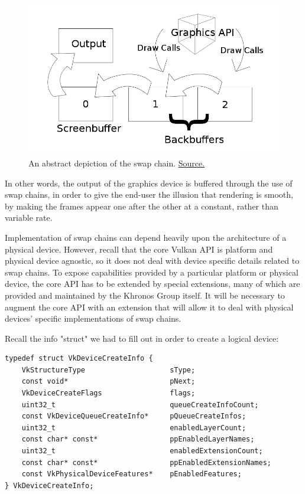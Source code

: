 \documentclass[12pt,letterpaper]{article}
\begin{document}
		\begin{figure}
			\centering
			\includegraphics[width=0.7\linewidth]{swap-chain-depiction}
			\caption{An abstract depiction of the swap chain. \href{https://en.wikipedia.org/wiki/File:Swap_chain_depiction.svg}{Source.}}
			\label{fig:swap-chain-depiction}
		\end{figure}

	In other words, the output of the graphics device is buffered through the use of swap chains, in order to give the end-user the illusion that rendering is smooth, by making the frames appear one after the other at a constant, rather than variable rate.
	
	Implementation of swap chains can depend heavily upon the architecture of a physical device. However, recall that the core Vulkan API is platform and physical device agnostic, so it does not deal with device specific details related to swap chains. To expose capabilities provided by a particular platform or physical device, the core API has to be extended by special extensions, many of which are provided and maintained by the Khronos Group itself. It will be necessary to augment the core API with an extension that will allow it to deal with physical devices' specific implementations of swap chains. 
	
    Recall the info "struct" we had to fill out in order to create a logical device:
\begin{verbatim}
typedef struct VkDeviceCreateInfo {
	VkStructureType                    sType;
	const void*                        pNext;
	VkDeviceCreateFlags                flags;
	uint32_t                           queueCreateInfoCount;
	const VkDeviceQueueCreateInfo*     pQueueCreateInfos;
	uint32_t                           enabledLayerCount;
	const char* const*                 ppEnabledLayerNames;
	uint32_t                           enabledExtensionCount;
	const char* const*                 ppEnabledExtensionNames;
	const VkPhysicalDeviceFeatures*    pEnabledFeatures;
} VkDeviceCreateInfo;
\end{verbatim}
\end{document}
